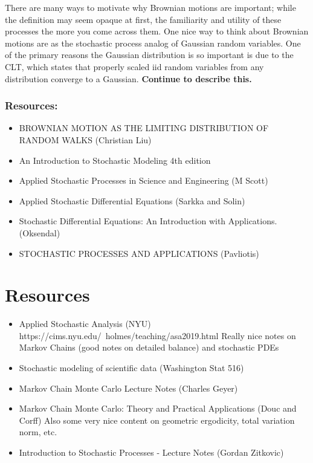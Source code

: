 \documentclass[12pt]{article}
\begin{document}
There are many ways to motivate why Brownian motions are important; while the definition may seem opaque at first, the familiarity and utility of these processes the more you come across them. 
One nice way to think about Brownian motions are as the stochastic process analog of Gaussian random variables. One of the primary reasons the Gaussian distribution is so important is due to 
the CLT, which states that properly scaled iid random variables from any distribution converge to a Gaussian. \textbf{Continue to describe this.}




\subsubsection{Resources:}
\begin{itemize}
\item BROWNIAN MOTION AS THE LIMITING DISTRIBUTION OF RANDOM WALKS (Christian Liu)
\item An Introduction to Stochastic Modeling 4th edition 
\item Applied Stochastic Processes in Science and Engineering (M Scott)
\item Applied Stochastic Differential Equations (Sarkka and Solin)
\item Stochastic Differential Equations: An Introduction with Applications. (Oksendal)
\item STOCHASTIC PROCESSES AND APPLICATIONS (Pavliotis)
\end{itemize}


\section{Resources}
\begin{itemize}
\item Applied Stochastic Analysis (NYU)
https://cims.nyu.edu/~holmes/teaching/asa2019.html
Really nice notes on Markov Chains (good notes on detailed balance) and stochastic PDEs
\item Stochastic modeling of scientific data (Washington Stat 516)
\item Markov Chain Monte Carlo Lecture Notes (Charles Geyer)
\item Markov Chain Monte Carlo: Theory and Practical Applications (Douc and Corff)
Also some very nice content on geometric ergodicity, total variation norm, etc.
\item Introduction to Stochastic Processes - Lecture Notes (Gordan Zitkovic)
\end{itemize}
\end{document}
